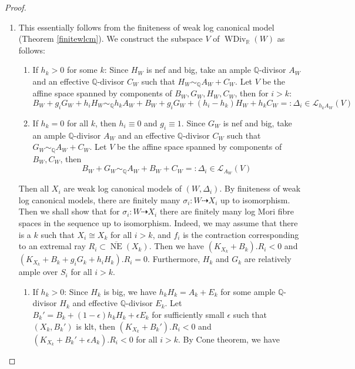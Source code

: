 \documentclass[11pt]{amsart}
\begin{document}
\begin{proof}
\begin{enumerate}
  \item This essentially follows from the finiteness of weak log canonical model (Theorem \ref{finitewlcm}). We construct the subspace $V$ of $\operatorname{WDiv}_{\mathbb{R}}(W)$ as follows: 
\begin{enumerate}
\item If $h_{k}>0$ for some $k$: Since $H_{W}$ is nef and big,  take an  ample $\mathbb{Q}$-divisor $A_{W}$ and an effective $\mathbb{Q}$-divisor $C_{W}$  such that $H_{W}\sim_{\mathbb{Q}}A_{W}+C_{W}$. Let $V$ be the affine space spanned by components of  $B_{W},G_{W},H_{W},C_{W}$, then for $i>k$:
    \[
      B_{W}+g_{i}G_{W}+h_{i}H_{W}\sim_{\mathbb{Q}} h_{k}A_{W}+B_{W}+g_{i}G_{W}+(h_{i}-h_{k})H_{W}+h_{k}C_{W}=:\Delta_{i} \in \mathcal{L}_{h_{k}A_{W}}(V)
    \]
  \item If $h_{k}=0$ for all $k$, then $h_{i}\equiv 0$ and $g_{i}\equiv 1$.  Since $G_{W}$ is nef and big,  take  an  ample $\mathbb{Q}$-divisor $A_{W}$ and an effective $\mathbb{Q}$-divisor $C_{W}$  such that $G_{W}\sim_{\mathbb{Q}}A_{W}+C_{W}$. Let $V$ be the affine space spanned by components of  $B_{W},C_{W}$, then 
    \[
      B_{W}+G_{W}\sim_{\mathbb{Q}} A_{W}+B_{W}+C_{W}=:\Delta_{i} \in \mathcal{L}_{A_{W}}(V)
    \]
\end{enumerate}
Then all $X_{i}$ are weak log canonical models of $(W,\Delta_{i})$. By finiteness of weak log canonical models, there are finitely many $\sigma_{i}:W\dashrightarrow X_{i}$ up to isomorphism. Then we shall show that for $\sigma_{i}:W\dashrightarrow X_{i}$ there are finitely many log Mori fibre spaces in the sequence up to isomorphism. 
Indeed, we may assume that there is a $k$ such that $X_{i} \cong X_{k}$ for all $i>k$, and  $f_{i}$ is the contraction corresponding to an extremal ray $R_{i} \subset \overline{\operatorname{NE}}(X_{k}) $. Then we have $(K_{X_{k}}+B_{k}).R_{i}<0  $ and $(K_{X_{k}}+B_{k}+g_{i}G_{k}+h_{i}H_{k}).R_{i}=0$. Furthermore, $H_{k}$ and $G_{k}$ are relatively ample over $S_{i}$ for all $i>k$.
\begin{enumerate}
\item If $h_{k}>0$: Since $H_{k}$ is big, we have $h_{k}H_{k}=A_{k}+E_{k}$ for some ample $\mathbb{Q}$-divisor $H_{k}$ and effective $\mathbb{Q}$-divisor  $E_{k}$. Let $B_{k}'=B_{k}+(1-\epsilon)h_{k}H_{k}+\epsilon E_{k}$ for sufficiently small $\epsilon$ such that $(X_{k},B_{k}')$ is klt, then $(K_{X_{k}}+B_{k}').R_{i}<0$ and $(K_{X_{k}}+B_{k}'+\epsilon A_{k}).R_{i}<0$ for all $i>k$. By Cone theorem, we have 

\end{enumerate}
\end{enumerate}
\end{proof}
\end{document}
